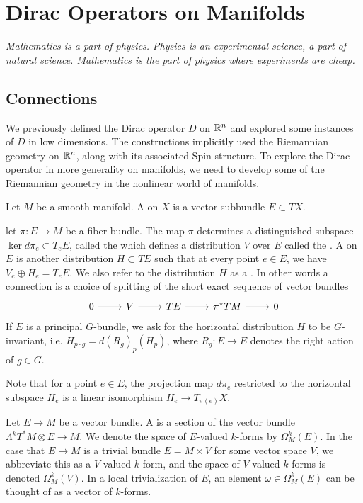 \chapter{Dirac Operators on Manifolds}
%
\subsectionend $ $\\
%
\emph{Mathematics is a part of physics. Physics is an experimental science, a part of
natural science. Mathematics is the part of physics where experiments are cheap.} \\
%
%
\subsectionend
%
\section{Connections}
%
We previously defined the Dirac operator $D$ on $\mathbb{R}^n$ and explored some
instances of $D$ in low dimensions. The constructions implicitly used the
Riemannian geometry on $\mathbb{R}^n$, along with its associated Spin structure.
To explore the Dirac operator in more generality on manifolds, we need to
develop some of the Riemannian geometry in the nonlinear world of manifolds.
%
\begin{defn}
Let $M$ be a smooth manifold. A  on $X$ is a vector subbundle
$E \subset TX$.
\end{defn}
%
\begin{defn}
let $\pi : E \to M$ be a fiber bundle. The map $\pi$ determines a distinguished
subspace $\ker d\pi_e \subset T_eE$, called the 
which defines a distribution $V$ over $E$ called the .
A  on $E$ is another distribution $H \subset TE$ such that
at every point $e \in E$, we have $V_e \oplus H_e = T_eE$. We also refer to the
distribution $H$ as a . In other words a connection
is a choice of splitting of the short exact sequence of vector bundles
\[\begin{tikzcd}
0 \ar[r] & V \ar[r] & TE \ar[r] & \pi^*TM \ar[r] & 0
\end{tikzcd}\]
If $E$ is a principal $G$-bundle, we ask for the horizontal distribution $H$
to be $G$-invariant, i.e. $H_{p \cdot g} = d(R_g)_p(H_p)$, where $R_g : E \to E$
denotes the right action of $g \in G$.
\end{defn}
%
Note that for a point $e \in E$, the projection map $d\pi_e$ restricted to
the horizontal subspace $H_e$ is a linear isomorphism $H_e \to T_{\pi(e)}X$.
%
\begin{defn}
Let $E \to M$ be a vector bundle. A  is a section of
the vector bundle $\Lambda^kT^*M \otimes E \to M$. We denote the space of
$E$-valued $k$-forms by $\Omega_M^k(E)$. In the case that $E \to M$ is a
trivial bundle $E = M \times V$ for some vector space $V$, we abbreviate
this as a $V$-valued $k$ form, and the space of $V$-valued $k$-forms is denoted
$\Omega_M^k(V)$. In a local trivialization of $E$, an element
$\omega \in \Omega^k_M(E)$ can be thought of as a vector of $k$-forms.
\end{defn}
